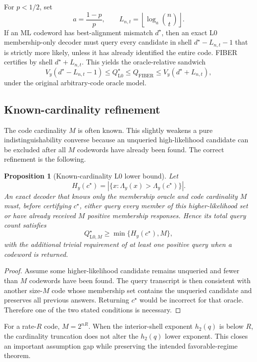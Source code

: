 \documentclass[11pt]{article}
\newtheorem{proposition}{Proposition}
\theoremstyle{definition}
\theoremstyle{remark}
\newcommand{\Qfib}{Q_{\mathrm{FIBER}}}
\newcommand{\Qopt}{Q_{\mathrm{L0}}^\star}
\newcommand{\hbin}{h_2}
\begin{document}
For $p<1/2$, set
\[
 a=\frac{1-p}{p},\qquad
 L_{n,t}=\left\lfloor\log_a\binom nt\right\rfloor.
\]
If an ML codeword has best-alignment mismatch $d^\star$, then an exact L0 membership-only decoder must query every candidate in shell $d^\star-L_{n,t}-1$ that is strictly more likely, unless it has already identified the entire code.  FIBER certifies by shell $d^\star+L_{n,t}$.  This yields the oracle-relative sandwich
\begin{equation}
  V_y(d^\star-L_{n,t}-1)
  \le \Qopt
  \le \Qfib
  \le V_y(d^\star+L_{n,t}),
  \label{eq:sandwich}
\end{equation}
under the original arbitrary-code oracle model.

\subsection{Known-cardinality refinement}
The code cardinality $M$ is often known.  This slightly weakens a pure indistinguishability converse because an unqueried high-likelihood candidate can be excluded after all $M$ codewords have already been found.  The correct refinement is the following.

\begin{proposition}[Known-cardinality L0 lower bound]
Let
\[
 H_y(c^\star)=\left|\{x:\Lambda_y(x)>\Lambda_y(c^\star)\}\right|.
\]
An exact decoder that knows only the membership oracle and code cardinality $M$ must, before certifying $c^\star$, either query every member of this higher-likelihood set or have already received $M$ positive membership responses.  Hence its total query count satisfies
\[
 Q_{\mathrm{L0},M}^\star\ge \min\{H_y(c^\star),M\},
\]
with the additional trivial requirement of at least one positive query when a codeword is returned.
\end{proposition}
\begin{proof}
Assume some higher-likelihood candidate remains unqueried and fewer than $M$ codewords have been found.  The query transcript is then consistent with another size-$M$ code whose membership set contains the unqueried candidate and preserves all previous answers.  Returning $c^\star$ would be incorrect for that oracle.  Therefore one of the two stated conditions is necessary.
\end{proof}

For a rate-$R$ code, $M=2^{nR}$.  When the interior-shell exponent $\hbin(q)$ is below $R$, the cardinality truncation does not alter the $\hbin(q)$ lower exponent.  This closes an important assumption gap while preserving the intended favorable-regime theorem.
\end{document}
